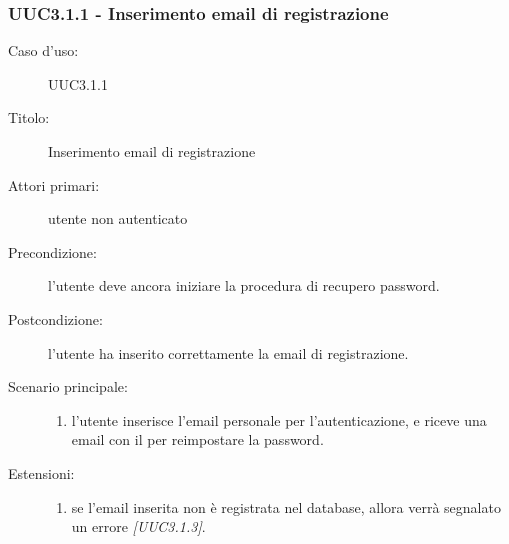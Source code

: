 \documentclass[../analisi-dei-requisiti.tex]{subfiles}
\begin{document}
\subsubsection{UUC3.1.1 - Inserimento email di registrazione}%
\label{subsub:UUC3.1.1utente}
\begin{description}
  \item[Caso d’uso:] UUC3.1.1
  \item[Titolo:] Inserimento email di registrazione
  \item[Attori primari:] utente non autenticato
  \item[Precondizione:] l'utente deve ancora iniziare la procedura di recupero password.
  \item[Postcondizione:] l'utente ha inserito correttamente la email di registrazione.
  \item[Scenario principale:]
        \begin{enumerate}
          \item l'utente inserisce l'email personale per l'autenticazione, e riceve una email con il  per reimpostare la password.
        \end{enumerate}
  \item[Estensioni:]
        \begin{enumerate}
          \item se l'email inserita non è registrata nel database, allora verrà segnalato un errore \emph{[UUC3.1.3]}.
        \end{enumerate}
\end{description}

\end{document}
